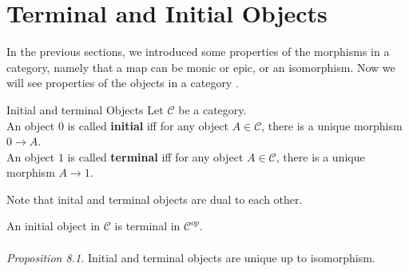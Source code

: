 \section {Terminal and Initial Objects}
In the previous sections, we introduced some properties of the morphisms in a category, namely that a map can be monic or epic, or an isomorphism. Now we will see properties of the objects in a category .
\begin {definition}{Initial and terminal Objects}
  Let $\mathscr{C}$ be a category.\\
  An object $0$ is called \textbf{initial}  iff for any object $A \in \mathscr{C}$,
  there is a unique morphism $0 \to A$.\\
  An object $1$ is called \textbf{terminal} iff for any object $A \in \mathscr{C}$,
  there is a unique morphism $A \to 1$.
\end {definition}

Note that inital and terminal objects are dual to each other.

An initial object in $\mathscr{C}$ is terminal in $\mathscr{C}^{op}$.\\
\\\textit{Proposition 8.1.}
Initial and terminal objects are unique up to isomorphism.

